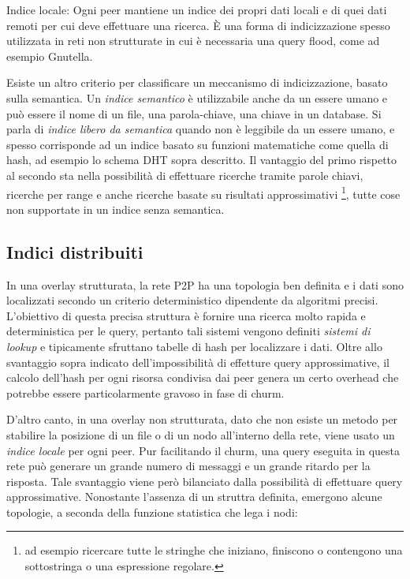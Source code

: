 Indice locale: Ogni peer mantiene un indice dei propri dati locali e di quei dati remoti per cui deve effettuare una ricerca. È una forma di indicizzazione spesso utilizzata in reti non strutturate in cui è necessaria una query flood, come ad esempio Gnutella.

Esiste un altro criterio per classificare un meccanismo di indicizzazione, basato sulla semantica. Un \emph{indice semantico} è utilizzabile anche da un essere umano e può essere il nome di un file, una parola-chiave, una chiave in un database. Si parla di \emph{indice libero da semantica} quando non è leggibile da un essere umano, e spesso corrisponde ad un indice basato su funzioni matematiche come quella di hash, ad esempio lo schema DHT sopra descritto. Il vantaggio del primo rispetto al secondo sta nella possibilità di effettuare ricerche tramite parole chiavi, ricerche per range e anche ricerche basate su risultati approssimativi \footnote{ad esempio ricercare tutte le stringhe che   iniziano, finiscono o contengono una sottostringa o una espressione   regolare.}, tutte cose non supportate in un indice senza semantica.

\subsection{Indici distribuiti}\label{indici-distribuiti-todo-probabilmente-posso-eliminare}

In una overlay strutturata, la rete P2P ha una topologia ben definita e i dati sono localizzati secondo un criterio deterministico dipendente da algoritmi precisi. L'obiettivo di questa precisa struttura è fornire una ricerca molto rapida e deterministica per le query, pertanto tali sistemi vengono definiti \emph{sistemi di lookup} e tipicamente sfruttano tabelle di hash per localizzare i dati. Oltre allo svantaggio sopra indicato dell'impossibilità di effetture query approssimative, il calcolo dell'hash per ogni risorsa condivisa dai peer genera un certo overhead che potrebbe essere particolarmente gravoso in fase di churm.

D'altro canto, in una overlay non strutturata, dato che non esiste un metodo per stabilire la posizione di un file o di un nodo all'interno della rete, viene usato un \emph{indice locale} per ogni peer. Pur facilitando il churm, una query eseguita in questa rete può generare un grande numero di messaggi e un grande ritardo per la risposta. Tale svantaggio viene però bilanciato dalla possibilità di effettuare query approssimative. Nonostante l'assenza di un struttra definita, emergono alcune topologie, a seconda della funzione statistica che lega i nodi:

